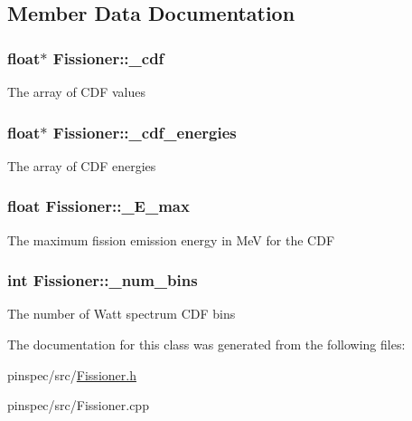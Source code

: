 \subsection{Member Data Documentation}
\hypertarget{classFissioner_a2669929b5d6d4dea800ffde9d6b11ff3}{
\subsubsection[{\-\_\-cdf}]{\setlength{\rightskip}{0pt plus 5cm}float$\ast$ Fissioner\-::\-\_\-cdf\hspace{0.3cm}{\ttfamily [private]}}}\label{classFissioner_a2669929b5d6d4dea800ffde9d6b11ff3}
The array of C\-D\-F values \hypertarget{classFissioner_aadb16d9d947ed4d0527487dc0d43111c}{
\subsubsection[{\-\_\-cdf\-\_\-energies}]{\setlength{\rightskip}{0pt plus 5cm}float$\ast$ Fissioner\-::\-\_\-cdf\-\_\-energies\hspace{0.3cm}{\ttfamily [private]}}}\label{classFissioner_aadb16d9d947ed4d0527487dc0d43111c}
The array of C\-D\-F energies \hypertarget{classFissioner_a5eac55547fe61b5e559628aefe569298}{
\subsubsection[{\-\_\-\-E\-\_\-max}]{\setlength{\rightskip}{0pt plus 5cm}float Fissioner\-::\-\_\-\-E\-\_\-max\hspace{0.3cm}{\ttfamily [private]}}}\label{classFissioner_a5eac55547fe61b5e559628aefe569298}
The maximum fission emission energy in Me\-V for the C\-D\-F \hypertarget{classFissioner_a541a4b34ec2fc989a376df0cc5f6e905}{
\subsubsection[{\-\_\-num\-\_\-bins}]{\setlength{\rightskip}{0pt plus 5cm}int Fissioner\-::\-\_\-num\-\_\-bins\hspace{0.3cm}{\ttfamily [private]}}}\label{classFissioner_a541a4b34ec2fc989a376df0cc5f6e905}
The number of Watt spectrum C\-D\-F bins 

The documentation for this class was generated from the following files\-:\begin{DoxyCompactItemize}
\item 
pinspec/src/\hyperlink{Fissioner_8h}{Fissioner.\-h}\item 
pinspec/src/Fissioner.\-cpp\end{DoxyCompactItemize}
